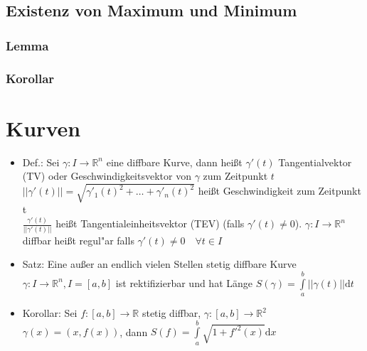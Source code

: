 \documentclass[10pt,a4paper^, twocolumn]{article}
\newcommand{\menge}{\mathbb} %
\renewcommand{\d}{\mathrm{d}} %
\begin{document}
\subsection{Existenz von Maximum und Minimum}
\subsubsection{Lemma}
\subsubsection{Korollar}

\section{Kurven}
\begin{itemize}
\item{Def.:} Sei $\gamma : I \rightarrow \menge{R}^n$ eine diffbare Kurve, 
dann heißt $\gamma'(t)$ Tangentialvektor (TV) oder Geschwindigkeitsvektor von $\gamma$ zum Zeitpunkt $t$ \\
$||\gamma'(t)|| = \sqrt{\gamma'_1(t)^2 + \dots + \gamma'_n(t)^2}$ heißt Geschwindigkeit zum Zeitpunkt t \\
$\frac{\gamma'(t)}{||\gamma'(t)||}$ heißt Tangentialeinheitsvektor (TEV) (falls $\gamma'(t) \neq 0$).
$\gamma: I \rightarrow \menge{R}^n$ diffbar heißt regul"ar falls $\gamma'(t) \neq 0 \quad \forall t \in I$
\item{Satz:} Eine außer an endlich vielen Stellen stetig diffbare Kurve $\gamma: I \rightarrow \menge{R}^n, I=[a,b]$ ist rektifizierbar und hat Länge
$S(\gamma) = \int\limits_a^b || \gamma(t) || \d t$
\item{Korollar:} Sei $f:[a,b] \rightarrow \menge{R}$ stetig diffbar, $\gamma:[a,b] \rightarrow \menge{R}^2$ \\
$\gamma(x) = (x, f(x))$, 
dann $S(f) = \int\limits_a^b\sqrt{1+f'^2(x)} \d x $
\end{itemize}
\end{document}
